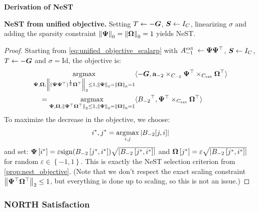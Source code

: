 \noindent\textbf{Derivation of NeST}

\begin{proposition}\label{prop:nest_derivation}

\textbf{NeST from unified objective.} Setting
\(T \leftarrow - \boldsymbol{G}\), \(\boldsymbol{S} \leftarrow I_{C}\),
linearizing \(\sigma\) and adding the sparsity constraint
\(\left\| \boldsymbol{\Psi}{} \right\|_{0} = \left\| \boldsymbol{\Omega}{} \right\|_{0} = 1\)
yields NeST.

\end{proposition}

\begin{proof}

Starting from \autoref{eq:unified_objective_scalarp} with
\(A_{- 1}^{\text{ext }} \leftarrow \boldsymbol{\Psi}{}\boldsymbol{\Psi}{}^{\top}\),
\(\boldsymbol{S} \leftarrow I_{C}\), \(T \leftarrow - \boldsymbol{G}\) and
\(\sigma = \text{Id}\), the objective is: \[\begin{aligned}
\operatorname*{\arg\!\max}_{\boldsymbol{\Psi}{},\boldsymbol{\Omega}{},\left\| {\left( \boldsymbol{\Psi}{}\boldsymbol{\Psi}{}^{\top} \right)^{\frac{1}{2}}\boldsymbol{\Omega}{}^{\top}} \right\|_{2} \leq 1,\left\| \boldsymbol{\Psi}{} \right\|_{0} = \left\| \boldsymbol{\Omega}{} \right\|_{0} = 1} & {\langle - \boldsymbol{G},\mathbf{a}_{- 2} \times_{C_{- 2}}\boldsymbol{\Psi}{}^{\top} \times_{C_{\text{ext}}}\boldsymbol{\Omega}{}^{\top}\rangle} \\
 = \operatorname*{\arg\!\max}_{\boldsymbol{\Psi}{},\boldsymbol{\Omega}{},\left\| {\boldsymbol{\Psi}{}^{\top}\boldsymbol{\Omega}{}^{\top}} \right\|_{2} \leq 1,\left\| \boldsymbol{\Psi}{} \right\|_{0} = \left\| \boldsymbol{\Omega}{} \right\|_{0} = 1} & {\langle{B_{- 2}}^{\top},\boldsymbol{\Psi}{}^{\top} \times_{C_{\text{ext}}}\boldsymbol{\Omega}{}^{\top}\rangle}
\end{aligned}\]
To maximize the decrease in the objective, we choose:
\[i^{\ast},j^{\ast} = \operatorname*{\arg\!\max}_{i,j}\left| {B_{- 2}\lbrack j,i\rbrack} \right|\]
and set:
\(\boldsymbol{\Psi}{}\left\lbrack i^{\ast} \right\rbrack = \varepsilon{\operatorname{sign}(B_{- 2}\left\lbrack j^{\ast},i^{\ast} \right\rbrack)}\sqrt{\left| {B_{- 2}\left\lbrack j^{\ast},i^{\ast} \right\rbrack} \right|}\)
and
\(\boldsymbol{\Omega}{}\left\lbrack j^{\ast} \right\rbrack = \varepsilon\sqrt{\left| {B_{- 2}\left\lbrack j^{\ast},i^{\ast} \right\rbrack} \right|}\)
for random \(\varepsilon \in \left\{ - 1,1 \right\}\). This is exactly
the NeST selection criterion from \autoref{prop:nest_objective}. (Note that
we don't respect the exact scaling constraint
\(\left\| {\boldsymbol{\Psi}{}^{\top}\boldsymbol{\Omega}{}^{\top}} \right\|_{2} \leq 1\), but
everything is done up to scaling, so this is not an issue.)

\end{proof}

\subsubsection{NORTH Satisfaction}

